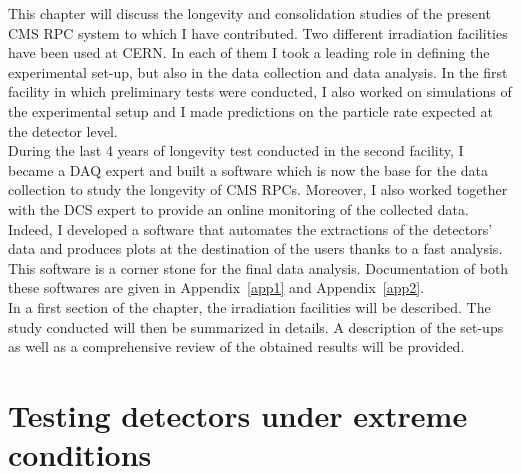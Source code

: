 	This chapter will discuss the longevity and consolidation studies of the present CMS RPC system to which I have contributed. Two different irradiation facilities have been used at CERN. In each of them I took a leading role in defining the experimental set-up, but also in the data collection and data analysis. In the first facility in which preliminary tests were conducted, I also worked on simulations of the experimental setup and I made predictions on the particle rate expected at the detector level.\\
	During the last 4 years of longevity test conducted in the second facility, I became a DAQ expert and built a software which is now the base for the data collection to study the longevity of CMS RPCs. Moreover, I also worked together with the \acf{DCS} expert to provide an online monitoring of the collected data. Indeed, I developed a software that automates the extractions of the detectors' data and produces plots at the destination of the users thanks to a fast analysis. This software is a corner stone for the final data analysis. Documentation of both these softwares are given in Appendix~\ref{app1} and Appendix~\ref{app2}.\\
	In a first section of the chapter, the irradiation facilities will be described. The study conducted will then be summarized in details. A description of the set-ups as well as a comprehensive review of the obtained results will be provided.

\section{Testing detectors under extreme conditions}
\label{chapt5:sec:extreme}
    
